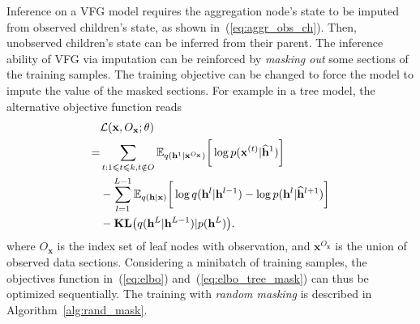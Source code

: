 \documentclass[sigconf, anonymous, review]{acmart}
\theoremstyle{plain}
\theoremstyle{definition}
\theoremstyle{remark}
\begin{document}
Inference on a VFG model requires the aggregation node's state to be imputed from observed children's state, as shown in~(\ref{eq:aggr_obs_ch}).
Then, unobserved children's state can be inferred from their parent.  
The inference ability of VFG via imputation can be reinforced by \emph{masking out} some sections of the training samples. 
The training objective can be changed to force the model to impute the value of the masked sections. 
For example in a tree model, the alternative objective function reads 
\begin{align}  \label{eq:elbo_tree_mask}
& \mathcal{L}(\mathbf{x}, O_{\mathbf{x}}; \theta) \\ \notag
= & \sum_{t: 1\leqslant t \leqslant k, t\notin O}
 \mathbb{E}_{q(\mathbf{h}^{1}|\mathbf{x}^{O_{\mathbf{x}}} )} \bigg[ \log p( \mathbf{x}^{(t)}|  \widehat{\mathbf{h}}^{1})   \bigg] \\ \notag
 &- \sum_{l=1}^{L-1}  \mathbb{E}_{q(\mathbf{h}|\mathbf{x})} \bigg[ \log q(\mathbf{h}^{l}|\mathbf{h}^{l-1}) - \log p( \mathbf{h}^{l}|  \widehat{\mathbf{h}}^{l+1})   \bigg]    
\\ \notag
& -  \textbf{\text{KL}}\big(q(\mathbf{h}^L | \mathbf{h}^{L-1} )   | p(\mathbf{h}^L)  \big).
\end{align} %
where $O_{\mathbf{x}}$ is the index set of leaf nodes  with observation, and $\mathbf{x}^{O_{\mathbf{x}}}$ is the union of observed data sections. 
Considering a minibatch of training samples, the objectives function in~(\ref{eq:elbo})
and~(\ref{eq:elbo_tree_mask}) can thus be optimized sequentially. 
The training with \emph{random masking} is described in Algorithm~\ref{alg:rand_mask}. 
\end{document}
